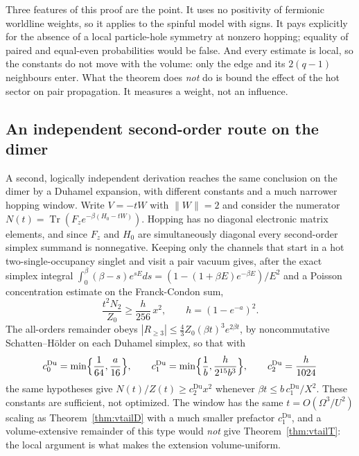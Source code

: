 \documentclass[11pt]{article}
\theoremstyle{definition}
\theoremstyle{remark}
\begin{document}
Three features of this proof are the point. It uses no positivity of fermionic
worldline weights, so it applies to the spinful model with signs. It pays
explicitly for the absence of a local particle-hole symmetry at nonzero hopping;
equality of paired and equal-even probabilities would be false. And every
estimate is local, so the constants do not move with the volume: only the edge and
its $2(q-1)$ neighbours enter. What the theorem does \emph{not} do is bound the
effect of the hot sector on pair propagation. It measures a weight, not an
influence.

\subsection{An independent second-order route on the dimer}

A second, logically independent derivation reaches the same conclusion on the
dimer by a Duhamel expansion, with different constants and a much narrower hopping
window. Write $V=-tW$ with $\|W\|=2$ and consider the numerator
$N(t)=\operatorname{Tr}(F_{z}e^{-\beta(H_{0}-tW)})$. Hopping has no diagonal
electronic matrix elements, and since $F_{z}$ and $H_{0}$ are simultaneously
diagonal every second-order simplex summand is nonnegative. Keeping only the
channels that start in a hot two-single-occupancy singlet and visit a pair vacuum
gives, after the exact simplex integral
$\int_{0}^{\beta}(\beta-s)e^{sE}ds=(1-(1+\beta E)e^{-\beta E})/E^{2}$ and a
Poisson concentration estimate on the Franck-Condon sum,
\begin{equation}
\frac{t^{2}N_{2}}{Z_{0}}\ge\frac{h}{256}\,x^{2},
\qquad h=(1-e^{-a})^{2}.
\end{equation}
The all-orders remainder obeys
$|R_{\ge3}|\le\frac43Z_{0}(\beta t)^{3}e^{2\beta t}$, by noncommutative
Schatten--H\"older on each Duhamel simplex, so that with
\begin{equation}
c_{0}^{\mathrm{Du}}=\min\Bigl\{\frac1{64},\frac{a}{16}\Bigr\},\qquad
c_{1}^{\mathrm{Du}}=\min\Bigl\{\frac1b,\frac{h}{2^{15}b^{3}}\Bigr\},\qquad
c_{2}^{\mathrm{Du}}=\frac{h}{1024}
\label{eq:duconstants}
\end{equation}
the same hypotheses give $N(t)/Z(t)\ge c_{2}^{\mathrm{Du}}x^{2}$ whenever
$\beta t\le b\,c_{1}^{\mathrm{Du}}/X^{2}$. These constants are sufficient, not
optimized. The window has the same $t=O(\Omega^{3}/U^{2})$ scaling as
Theorem~\ref{thm:vtailD} with a much smaller prefactor $c_{1}^{\mathrm{Du}}$, and a
volume-extensive remainder of this type would
\emph{not} give Theorem~\ref{thm:vtailT}: the local argument is what makes the
extension volume-uniform.
\end{document}
